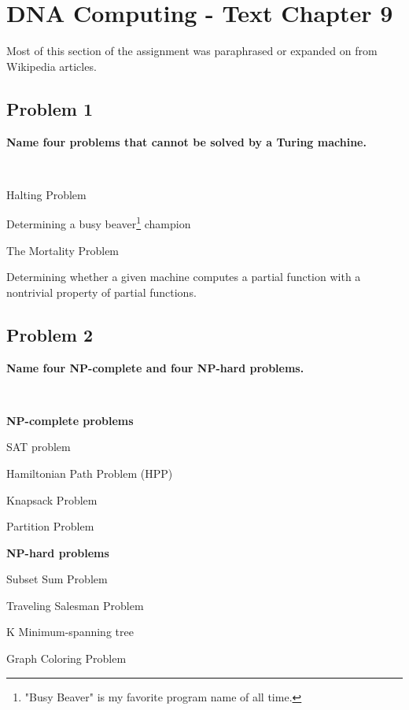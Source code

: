 
\chapter{DNA Computing - Text Chapter 9}

Most of this section of the assignment was paraphrased or expanded on from Wikipedia articles.

\section{Problem 1}
\textbf{
Name four problems that cannot be solved by a Turing machine.
}

\hfill \\

\begin{description}
\item Halting Problem
\item Determining a busy beaver\footnote{"Busy Beaver" is my favorite program name of all time.} champion
\item The Mortality Problem
\item Determining whether a given machine computes a partial function with a nontrivial property of partial functions.
\end{description}


\section{Problem 2}
\textbf{
Name four NP-complete and four NP-hard problems.
}

\hfill \\

\begin{minipage}[b]{.5\hsize}
	\centerline{\textbf{NP-complete problems}}
	\begin{description}
	\item{SAT problem}
	\item{Hamiltonian Path Problem (HPP)}
	\item{Knapsack Problem}
	\item{Partition Problem}
	\end{description}
\end{minipage}	
\begin{minipage}[b]{.5\hsize}
	\centerline{\textbf{NP-hard problems}}
	\begin{description}
	\item{Subset Sum Problem}
	\item{Traveling Salesman Problem}
	\item{K Minimum-spanning tree}
	\item{Graph Coloring Problem}
	\end{description}
\end{minipage}


